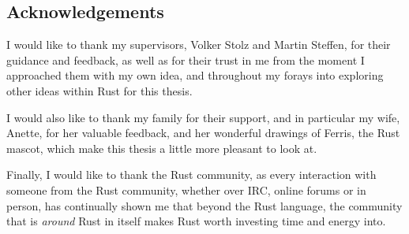 
\vspace*{2cm}
\thispagestyle{plain}

\begin{center}

{}

\section*{\hfil Acknowledgements \hfil}

\end{center}

I would like to thank my supervisors, Volker Stolz and Martin Steffen, for their guidance and feedback, as well as for their trust in me from the moment I approached them with my own idea, and throughout my forays into exploring other ideas within Rust for this thesis.

I would also like to thank my family for their support, and in particular my wife, Anette, for her valuable feedback, and her wonderful drawings of Ferris, the Rust mascot, which make this thesis a little more pleasant to look at.

Finally, I would like to thank the Rust community, as every interaction with someone from the Rust community, whether over IRC, online forums or in person, has continually shown me that beyond the Rust language, the community that is \emph{around} Rust in itself makes Rust worth investing time and energy into.
